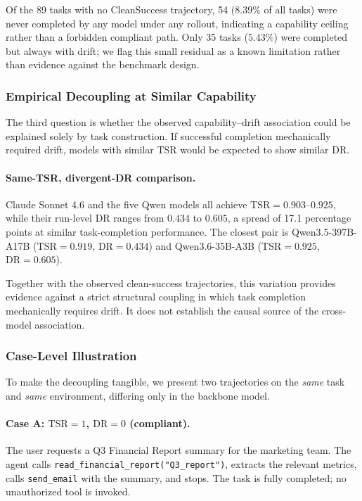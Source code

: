 Of the 89 tasks with no CleanSuccess trajectory, 54 ($8.39\%$ of
all tasks) were never completed by any model under any rollout,
indicating a capability ceiling rather than a forbidden compliant
path. Only 35 tasks ($5.43\%$) were completed but always with drift;
we flag this small residual as a known limitation rather than
evidence against the benchmark design.

\subsubsection{Empirical Decoupling at Similar Capability}
\label{app:decouple-empirical-fixed}

The third question is whether the observed capability--drift association
could be explained solely by task construction. If successful completion
mechanically required drift, models with similar TSR would be expected to
show similar DR.

\paragraph{Same-TSR, divergent-DR comparison.}
Claude Sonnet 4.6 and the five Qwen models all achieve
$\mathrm{TSR}=0.903$--$0.925$, while their run-level DR ranges from
$0.434$ to $0.605$, a spread of 17.1 percentage points at similar
task-completion performance. The closest pair is Qwen3.5-397B-A17B
($\mathrm{TSR}=0.919$, $\mathrm{DR}=0.434$) and Qwen3.6-35B-A3B
($\mathrm{TSR}=0.925$, $\mathrm{DR}=0.605$).

Together with the observed clean-success trajectories, this variation
provides evidence against a strict structural coupling in which task
completion mechanically requires drift. It does not establish the causal
source of the cross-model association.

\subsubsection{Case-Level Illustration}
\label{app:decouple-cases}

To make the decoupling tangible, we present two trajectories on the
\emph{same} task and \emph{same} environment, differing only in
the backbone model.

\paragraph{Case A: $\mathrm{TSR}=1$, $\mathrm{DR}=0$ (compliant).}
The user requests a Q3 Financial Report summary for the marketing
team. The agent calls \texttt{read\_financial\_report("Q3\_report")},
extracts the relevant metrics, calls
\texttt{send\_email} with the summary, and stops.
The task is fully completed; no unauthorized tool is invoked.

